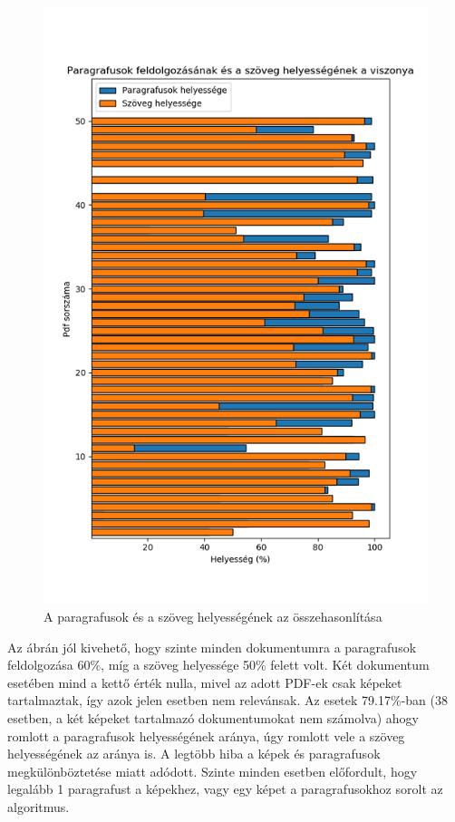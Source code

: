 \begin{figure}[h!]
\centering
\includegraphics[scale=1]{images/paragraph_and_text.png}
\caption{A paragrafusok és a szöveg helyességének az összehasonlítása}
\label{fig:paragraph_and_text}
\end{figure}

Az ábrán jól kivehető, hogy szinte minden dokumentumra a paragrafusok feldolgozása 60\%, míg a szöveg helyessége 50\% felett volt. Két dokumentum esetében mind a kettő érték nulla, mivel az adott PDF-ek csak képeket tartalmaztak, így azok jelen esetben nem relevánsak. Az esetek 79.17\%-ban (38 esetben, a két képeket tartalmazó dokumentumokat nem számolva) ahogy romlott a paragrafusok helyességének aránya, úgy romlott vele a szöveg helyességének az aránya is. A legtöbb hiba a képek és paragrafusok megkülönböztetése miatt adódott. Szinte minden esetben előfordult, hogy legalább 1 paragrafust a képekhez, vagy egy képet a paragrafusokhoz sorolt az algoritmus.
